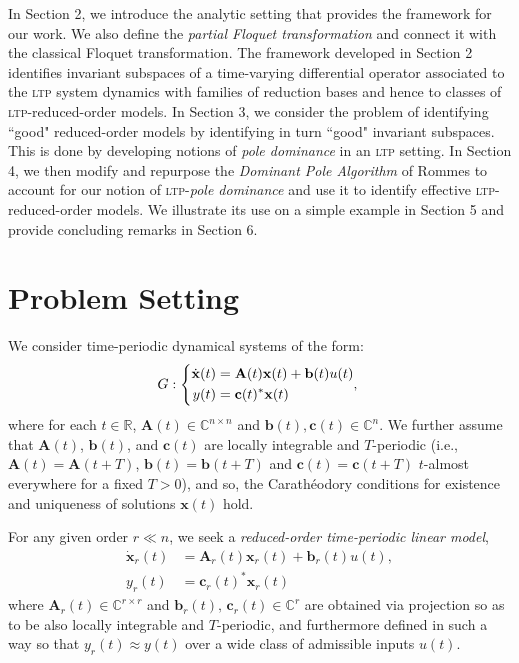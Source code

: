 \documentclass[pdflatex,sn-mathphys-num]{sn-jnl}%
\theoremstyle{thmstyleone}%
\theoremstyle{thmstyletwo}%
\theoremstyle{thmstylethree}%
\def\Bc{{\bf c}}  \def\BC{{\bf C}}
\begin{document}
In Section 2, we introduce the analytic setting that provides the framework for our work. We also define the \emph{partial Floquet transformation} and connect it with the classical Floquet transformation.  The framework developed in Section 2 identifies invariant subspaces of a time-varying differential operator associated to the \textsc{ltp} system dynamics with families of reduction bases and hence to classes of \textsc{ltp}-reduced-order models.  In Section 3, we consider the problem of identifying ``good" reduced-order models by identifying in turn ``good" invariant subspaces.  This is done by developing notions of \emph{pole dominance} in an \textsc{ltp} setting.  In Section 4, we then modify and repurpose the \emph{Dominant Pole Algorithm} of Rommes \cite{rommesDPA} to account for our notion of \textsc{ltp}-\emph{pole dominance} and use it to identify effective \textsc{ltp}-reduced-order models. We illustrate its use on a simple example in Section 5 and provide concluding remarks in Section 6.  


\section{Problem Setting}\label{sec2_problemSetting}

We consider time-periodic dynamical systems of the form:
\begin{equation}
\label{eq:FOM}
    G: \left\{
	\begin{aligned}
			\dot{\mathbf{x}}(t) &= \mathbf{A}(t) \mathbf{x}(t) + \mathbf{b}(t) u(t)\\
		y(t) &= \Bc(t)^* \mathbf{x}(t)
	\end{aligned},\right.
\end{equation}
where for each $t\in\mathbb{R}$, $\mathbf{A}(t) \in \mathbb{C}^{n \times n}$ and $\mathbf{b}(t), \mathbf{c}(t)\in\mathbb{C}^{n}$. We further assume that $\mathbf{A}(t)$, $\mathbf{b}(t)$, and $\mathbf{c}(t)$ are locally integrable and $T$-periodic (i.e., $\mathbf{A}(t) = \mathbf{A}(t+T)$, $\mathbf{b}(t) = \mathbf{b}(t+T)$ and $\mathbf{c}(t) = \mathbf{c}(t+T)$ $t$-almost everywhere for a fixed $T>0$), and so, the Carath\'{e}odory conditions for existence and uniqueness of  solutions $\mathbf{x}(t)$ hold. 
 
 For any given order $r\ll n$, we seek a \emph{reduced-order time-periodic linear model},
		\begin{equation}
		\label{eq:ROM}
         \begin{aligned}
			\dot{\mathbf{x}}_r(t) &= \mathbf{A}_r(t)\mathbf{x}_r(t) + \mathbf{b}_r(t){u}(t),\\[2mm]
			{y}_r(t) &= \mathbf{c}_r(t)^*\mathbf{x}_r(t)
		\end{aligned} 
	\end{equation}
where  $\mathbf{A}_r(t) \in \mathbb{C}^{r \times r}$ and $\mathbf{b}_r(t),\, \mathbf{c}_r(t) \in \mathbb{C}^{r}$  are obtained via projection so as to be also locally integrable and $T$-periodic, and furthermore defined in such a way so that $ {y}_r(t) \approx {y}(t)$ over a wide class of admissible inputs ${u}(t)$.	
\end{document}
